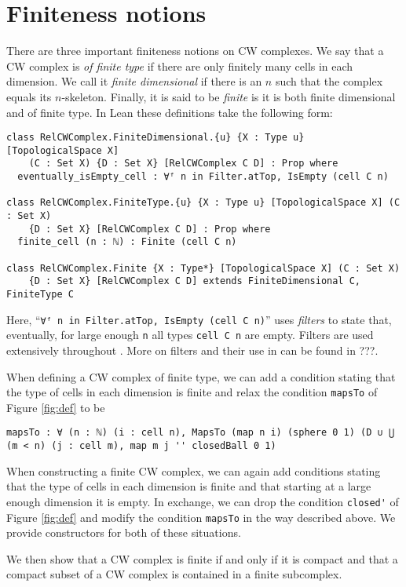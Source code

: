\section{Finiteness notions}


There are three important finiteness notions on CW complexes. 
We say that a CW complex is \emph{of finite type} if there are only finitely many cells in each dimension. 
We call it \emph{finite dimensional} if there is an $n$ such that the complex equals its $n$-skeleton.
Finally, it is said to be \emph{finite} is it is both finite dimensional and of finite type. 
In Lean these definitions take the following form: 

\begin{lstlisting}[frame=single]
class RelCWComplex.FiniteDimensional.{u} {X : Type u} [TopologicalSpace X] 
    (C : Set X) {D : Set X} [RelCWComplex C D] : Prop where
  eventually_isEmpty_cell : ∀ᶠ n in Filter.atTop, IsEmpty (cell C n)

class RelCWComplex.FiniteType.{u} {X : Type u} [TopologicalSpace X] (C : Set X) 
    {D : Set X} [RelCWComplex C D] : Prop where
  finite_cell (n : ℕ) : Finite (cell C n)

class RelCWComplex.Finite {X : Type*} [TopologicalSpace X] (C : Set X) 
    {D : Set X} [RelCWComplex C D] extends FiniteDimensional C, FiniteType C
\end{lstlisting}

Here, ``\lstinline|∀ᶠ n in Filter.atTop, IsEmpty (cell C n)|'' uses \emph{filters} to state that, eventually, for large enough \lstinline|n| all types \lstinline|cell C n| are empty. 
Filters are used extensively throughout \mathlib. 
More on filters and their use in \mathlib can be found in ???. 

When defining a CW complex of finite type, we can add a condition stating that the type of cells in each dimension is finite and relax the condition \lstinline|mapsTo| of Figure \ref{fig:def} to be

\begin{lstlisting}[frame=single]
mapsTo : ∀ (n : ℕ) (i : cell n), MapsTo (map n i) (sphere 0 1) (D ∪ ⋃ (m < n) (j : cell m), map m j '' closedBall 0 1)
\end{lstlisting}

When constructing a finite CW complex, we can again add conditions stating that the type of cells in each dimension is finite and that starting at a large enough dimension it is empty.
In exchange, we can drop the condition \lstinline|closed'| of Figure \ref{fig:def} and modify the condition \lstinline|mapsTo| in the way described above. 
We provide constructors for both of these situations.

We then show that a CW complex is finite if and only if it is compact and that a compact subset of a CW complex is contained in a finite subcomplex.